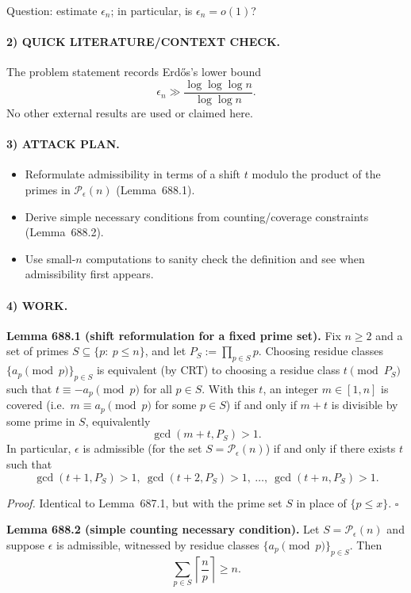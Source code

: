 Question: estimate $\epsilon_n$; in particular, is $\epsilon_n=o(1)$?

\paragraph{2) QUICK LITERATURE/CONTEXT CHECK.}
The problem statement records Erd\H{o}s's lower bound
\[
\epsilon_n \gg \frac{\log\log\log n}{\log\log n}.
\]
No other external results are used or claimed here.

\paragraph{3) ATTACK PLAN.}
\begin{itemize}
\item Reformulate admissibility in terms of a shift $t$ modulo the product of the primes in $\mathcal P_\epsilon(n)$ (Lemma~688.1).
\item Derive simple necessary conditions from counting/coverage constraints (Lemma~688.2).
\item Use small-$n$ computations to sanity check the definition and see when admissibility first appears.
\end{itemize}

\paragraph{4) WORK.}
\medskip
\noindent\textbf{Lemma 688.1 (shift reformulation for a fixed prime set).}
Fix $n\ge 2$ and a set of primes $S\subseteq\{p:\ p\le n\}$, and let $P_S:=\prod_{p\in S}p$.
Choosing residue classes $\{a_p\pmod p\}_{p\in S}$ is equivalent (by CRT) to choosing a residue class $t\pmod{P_S}$ such that
$t\equiv -a_p\pmod p$ for all $p\in S$.
With this $t$, an integer $m\in[1,n]$ is covered (i.e.\ $m\equiv a_p\pmod p$ for some $p\in S$) if and only if $m+t$ is divisible by some
prime in $S$, equivalently
\[
\gcd(m+t,P_S)>1.
\]
In particular, $\epsilon$ is admissible (for the set $S=\mathcal P_\epsilon(n)$) if and only if there exists $t$ such that
\[
\gcd(t+1,P_S)>1,\ \gcd(t+2,P_S)>1,\ \dots,\ \gcd(t+n,P_S)>1.
\]

\emph{Proof.}
Identical to Lemma~687.1, but with the prime set $S$ in place of $\{p\le x\}$. \hfill$\square$

\medskip
\noindent\textbf{Lemma 688.2 (simple counting necessary condition).}
Let $S=\mathcal P_\epsilon(n)$ and suppose $\epsilon$ is admissible, witnessed by residue classes $\{a_p\pmod p\}_{p\in S}$.
Then
\[
\sum_{p\in S}\left\lceil\frac{n}{p}\right\rceil \ge n.
\]

